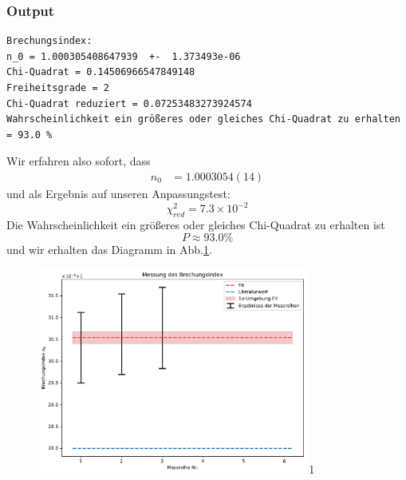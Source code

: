 \documentclass[a4paper,10pt]{article}
\begin{document}
\subsubsection{Output}
\begin{lstlisting}
Brechungsindex:
n_0 = 1.000305408647939  +-  1.373493e-06
Chi-Quadrat = 0.14506966547849148
Freiheitsgrade = 2
Chi-Quadrat reduziert = 0.07253483273924574
Wahrscheinlichkeit ein größeres oder gleiches Chi-Quadrat zu erhalten = 93.0 %

\end{lstlisting}
Wir erfahren also sofort, dass
\begin{align*}
n_0&=1.0003054(14)
\end{align*}
und als Ergebnis auf unseren Anpassungstest:
\[\chi^{2}_{red}=7.3\times10^{-2}\]
Die Wahrscheinlichkeit ein größeres oder gleiches Chi-Quadrat zu erhalten ist
 \[P\approx  93.0 \%\]
und wir erhalten das Diagramm in Abb.\ref{fig:Fig3}.
\begin{figure}[htb]
  \centering
  \begin{annotate}{\includegraphics[width=0.8\textwidth]{232_Fig3.pdf}}{1}
  \end{annotate}
\caption{}
\label{fig:Fig3}
\end{figure}
\end{document}
